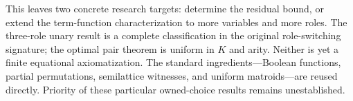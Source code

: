 \documentclass[11pt]{article}
\begin{document}
This leaves two concrete research targets: determine the residual bound,
or extend the term-function characterization to more variables and more
roles. The three-role unary result is a complete classification in the
original role-switching signature; the optimal pair theorem is uniform
in $K$ and arity. Neither is yet a finite equational axiomatization.
The standard ingredients---Boolean functions, partial permutations,
semilattice witnesses, and uniform matroids---are reused directly.
Priority of these particular owned-choice results remains unestablished.



\end{document}
